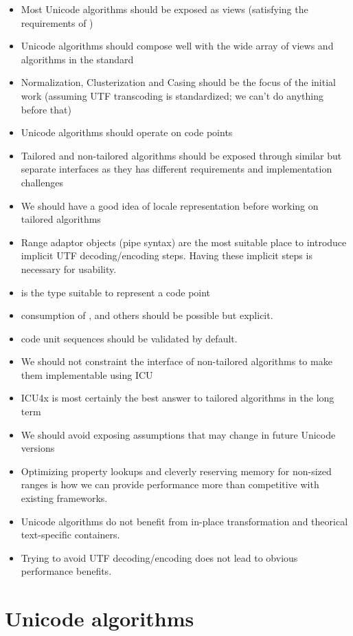 \documentclass{wg21}
\begin{document}
\begin{itemize}
\item Most Unicode algorithms should be exposed as views (satisfying the requirements of )
\item Unicode algorithms should compose well with the wide array of views and algorithms in the standard
\item Normalization, Clusterization and Casing should be the focus of the initial work (assuming UTF transcoding is standardized; we can't do anything before that)
\item Unicode algorithms should operate on code points
\item Tailored and non-tailored algorithms should be exposed through similar but separate interfaces as they has different requirements and implementation challenges
\item We should have a good idea of locale representation before working on tailored algorithms
\item Range adaptor objects (pipe syntax) are the most suitable place to introduce implicit UTF decoding/encoding steps. Having these implicit steps is necessary for usability.
\item {} is the type suitable to represent a code point
\item consumption of ,  and others should be possible but explicit.
\item code unit sequences should be validated by default.
\item We should not constraint the interface of non-tailored algorithms to make them implementable using ICU
\item ICU4x is most certainly the best answer to tailored algorithms in the long term
\item We should avoid exposing assumptions that may change in future Unicode versions
\item Optimizing property lookups and cleverly reserving memory for non-sized ranges is how we can provide performance more than competitive with existing frameworks.
\item Unicode algorithms do not benefit from in-place transformation and theorical text-specific containers.
\item Trying to avoid UTF decoding/encoding does not lead to obvious performance benefits.
\end{itemize}

\section{Unicode algorithms}
\end{document}
